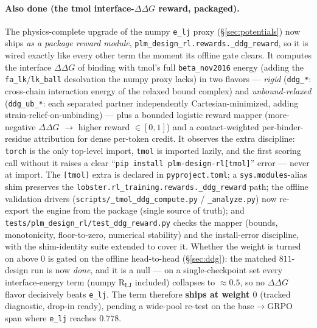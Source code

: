 \documentclass[11pt]{article}
\newcommand{\R}{\mathrm{R}}
\newcommand{\ttk}[1]{\texttt{\small #1}}
\begin{document}
\paragraph{Also done (the tmol interface-\texorpdfstring{$\Delta\Delta G$}{ddG} reward, packaged).}
The physics-complete upgrade of the numpy \ttk{e\_lj} proxy (\S\ref{sec:potentials}) now ships
\emph{as a package reward module}, \ttk{plm\_design\_rl.rewards.\_ddg\_reward}, so it is wired
exactly like every other term the moment its offline gate clears. It computes the interface
$\Delta\Delta G$ of binding with tmol's full \ttk{beta\_nov2016} energy (adding the
\ttk{fa\_lk}/\ttk{lk\_ball} desolvation the numpy proxy lacks) in two flavors --- \emph{rigid}
(\ttk{ddg\_*}: cross-chain interaction energy of the relaxed bound complex) and
\emph{unbound-relaxed} (\ttk{ddg\_ub\_*}: each separated partner independently Cartesian-minimized,
adding strain-relief-on-unbinding) --- plus a bounded logistic reward mapper (more-negative
$\Delta\Delta G$ $\to$ higher reward $\in[0,1]$) and a contact-weighted per-binder-residue
attribution for dense per-token credit. It observes the extra discipline: \ttk{torch} is the only
top-level import, \ttk{tmol} is imported lazily, and the first scoring call without it raises a
clear ``\ttk{pip install plm-design-rl[tmol]}'' error --- never at import. The \ttk{[tmol]} extra is
declared in \ttk{pyproject.toml}; a \ttk{sys.modules}-alias shim preserves the
\ttk{lobster.rl\_training.rewards.\_ddg\_reward} path; the offline validation drivers
(\ttk{scripts/\_tmol\_ddg\_compute.py} / \ttk{\_analyze.py}) now re-export the engine from the
package (single source of truth); and \ttk{tests/plm\_design\_rl/test\_ddg\_reward.py} checks the
mapper (bounds, monotonicity, floor-to-zero, numerical stability) and the install-error discipline,
with the shim-identity suite extended to cover it. Whether the weight is turned on above $0$ is
gated on the offline head-to-head (\S\ref{sec:ddg}): the matched $811$-design run is now
\emph{done}, and it is a null --- on a single-checkpoint set every interface-energy term (numpy
$\R_{\mathrm{LJ}}$ included) collapses to $\approx\!0.5$, so no $\Delta\Delta G$ flavor decisively
beats \ttk{e\_lj}. The term therefore \textbf{ships at weight $0$} (tracked diagnostic, drop-in
ready), pending a wide-pool re-test on the base$\rightarrow$GRPO span where \ttk{e\_lj} reaches
$0.778$.
\end{document}
